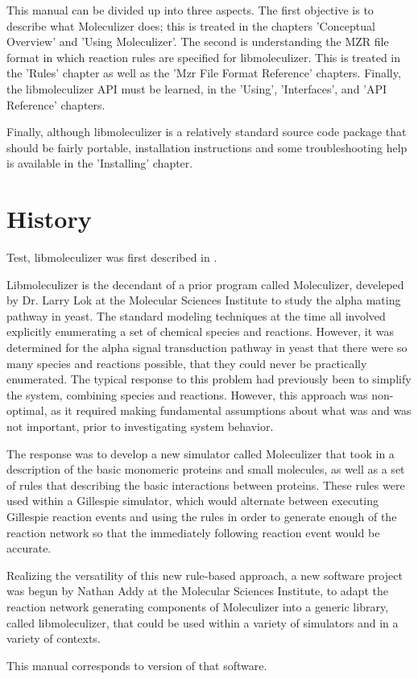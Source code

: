 This manual can be divided up into three aspects.  The first objective
is to describe what Moleculizer does; this is treated in the chapters
'Conceptual Overview' and 'Using Moleculizer'.  The second is understanding the
MZR file format in which reaction rules are specified for
libmoleculizer.  This is treated in the 'Rules' chapter as well as the
'Mzr File Format Reference' chapters.  Finally, the libmoleculizer API
must be learned, in the 'Using', 'Interfaces', and 'API Reference'
chapters.

Finally, although libmoleculizer is a relatively standard source code
package that should be fairly portable, installation instructions and
some troubleshooting help is available in the 'Installing' chapter.

\section{History}
Test, libmoleculizer was first described in \cite{lok05}.

Libmoleculizer is the decendant of a prior program called Moleculizer,
develeped by Dr. Larry Lok at the Molecular Sciences Institute to
study the alpha mating pathway in yeast. The standard modeling
techniques at the time all involved explicitly enumerating a set of
chemical species and reactions. However, it was determined for the
alpha signal transduction pathway in yeast that there were so many
species and reactions possible, that they could never be practically
enumerated. The typical response to this problem had previously been
to simplify the system, combining species and reactions. However,
this approach was non-optimal, as it required making fundamental
assumptions about what was and was not important, prior to
investigating system behavior. 

The response was to develop a new simulator called Moleculizer that
took in a description of the basic monomeric proteins and small
molecules, as well as a set of rules that describing the basic
interactions between proteins. These rules were used within a
Gillespie simulator, which would alternate between executing Gillespie
reaction events and using the rules in order to generate enough of the
reaction network so that the immediately following reaction event
would be accurate.  

Realizing the versatility of this new rule-based approach, a new
software project was begun by Nathan Addy at the Molecular Sciences
Institute, to adapt the reaction network generating components of
Moleculizer into a generic library, called libmoleculizer, that could
be used within a variety of simulators and in a variety of contexts.

This manual corresponds to version \currentversion of that software.